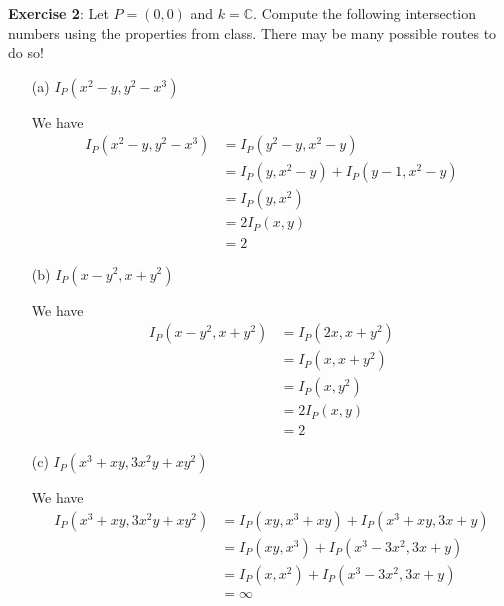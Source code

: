 \documentclass{article}
\begin{document}
\textbf{Exercise 2}: Let $P = (0, 0)$ and $k = \mathbb{C}$. Compute the following intersection numbers using the properties from class. There may be many possible routes to do so!
    \begin{itemize}
        \item [(a)] $I_{P}(x^{2} - y, y^{2} - x^{3})$
            \begin{answer}
                We have
                    \begin{align*}
                        I_{P}(x^{2} - y, y^{2} - x^{3}) &= I_{P}(y^{2} - y, x^{2} - y)                   \\
                                                        &= I_{P}(y, x^{2} - y) + I_{P}(y - 1, x^{2} - y) \\
                                                        &= I_{P}(y, x^{2})                               \\
                                                        &= 2I_{P}(x, y)                                  \\
                                                        &= 2                                               
                    \end{align*}
            \end{answer}

        \item [(b)] $I_{P}(x - y^{2}, x + y^{2})$
            \begin{answer}
                We have
                \begin{align*}
                    I_{P}(x - y^{2}, x + y^{2}) &= I_{P}(2x, x + y^{2}) \\
                                                &= I_{P}(x, x + y^{2})  \\
                                                &= I_{P}(x, y^{2})      \\
                                                &= 2I_{P}(x, y)         \\
                                                &= 2                      
                \end{align*}
            \end{answer}

        \item [(c)] $I_{P}(x^{3} + xy, 3x^{2}y + xy^{2})$
            \begin{answer}
                We have
                    \begin{align*}
                        I_{P}(x^{3} + xy, 3x^{2}y + xy^{2}) &= I_{P}(xy, x^{3} + xy) + I_{P}(x^{3} + xy, 3x + y) \\
                                                            &= I_{P}(xy, x^{3}) + I_{P}(x^{3} - 3x^{2}, 3x + y)  \\
                                                            &= I_{P}(x, x^{2}) + I_{P}(x^{3} - 3x^{2}, 3x + y)   \\
                                                            &= \infty                                              
                    \end{align*}
            \end{answer}


\end{itemize}
\end{document}
